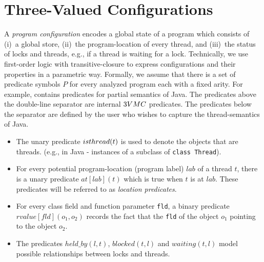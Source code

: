 \section{Three-Valued Configurations}

A \emph{program configuration} encodes a global state of a program
which consists of (i)~a global store, (ii)~the program-location of
every thread, and (iii)~the status of locks and threads, e.g., if
a thread is waiting for a lock. Technically, we use first-order
logic with transitive-closure to express configurations and their
properties in a parametric way. Formally, we assume that there is
a set of predicate symbols $P$ for every analyzed program each
with a fixed arity. For example,  contains
predicates for partial semantics of Java. The predicates above the
double-line separator are internal $\tvmc$ predicates. The
predicates below the separator are defined by the user who wishes
to capture the thread-semantics of Java.

\begin{itemize}
\item The unary predicate $isthread(t)$ is used to denote the
objects that are threads. (e.g., in Java - instances of a subclass
of \texttt{class Thread}).
\item For every potential program-location (program label) $lab$ of
a thread $t$, there is a unary predicate $at[lab](t)$ which is
true when $t$ is at $lab$. These predicates will be referred to as
\emph{location predicates}.
\item For every class field and function
parameter \texttt{fld}, a binary predicate $rvalue[fld](o_1,o_2)$
records the fact that the \texttt{fld} of the object $o_1$
pointing to the object $o_2$.
\item The predicates $held\_by(l,t)$, $blocked(t,l)$ and $waiting(t,l)$
model possible relationships between locks and threads.
\end{itemize}


